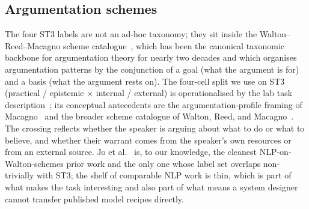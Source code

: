 \subsection{Argumentation schemes}
\label{sec:bg-schemes}

The four ST3 labels are not an ad-hoc taxonomy; they sit inside the Walton--Reed--Macagno scheme catalogue~\cite{walton2008schemes}, which has been the canonical taxonomic backbone for argumentation theory for nearly two decades and which organises argumentation patterns by the conjunction of a goal (what the argument is for) and a basis (what the argument rests on). The four-cell split we use on ST3 (practical / epistemic $\times$ internal / external) is operationalised by the lab task description~\cite{heinrich2026touche}; its conceptual antecedents are the argumentation-profile framing of Macagno~\cite{macagno2022argumentation} and the broader scheme catalogue of Walton, Reed, and Macagno~\cite{walton2008schemes}. The crossing reflects whether the speaker is arguing about what to do or what to believe, and whether their warrant comes from the speaker's own resources or from an external source. Jo et al.~\cite{jo2021schemes} is, to our knowledge, the cleanest NLP-on-Walton-schemes prior work and the only one whose label set overlaps non-trivially with ST3; the shelf of comparable NLP work is thin, which is part of what makes the task interesting and also part of what means a system designer cannot transfer published model recipes directly.

